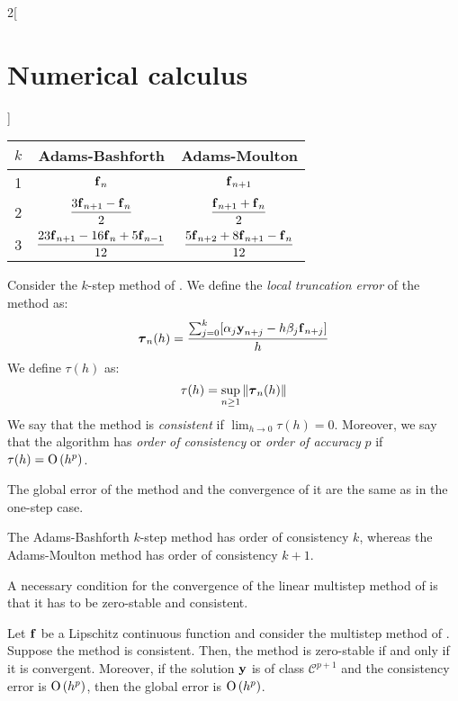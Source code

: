 \documentclass[../../../main_math.tex]{subfiles}
\begin{document}
\begin{multicols}{2}[\section{Numerical calculus}]
\begin{definition}
    \begin{center}
      \renewcommand{\arraystretch}{1.7}
      \begin{tabular}[ht]{c|c|c}
        $k$ & Adams-Bashforth                                                   & Adams-Moulton                                                  \\
        \hline
        1   & $\boldsymbol{\mathrm{f}}_n$                                                        & $\boldsymbol{\mathrm{f}}_{n+1}$                                                 \\
        2   & $\displaystyle\frac{3\boldsymbol{\mathrm{f}}_{n+1}-\boldsymbol{\mathrm{f}}_n}{2}$                   & $\displaystyle\frac{\boldsymbol{\mathrm{f}}_{n+1}+\boldsymbol{\mathrm{f}}_n}{2}$                 \\
        3   & $\displaystyle\frac{23\boldsymbol{\mathrm{f}}_{n+1}-16\boldsymbol{\mathrm{f}}_n+5\boldsymbol{\mathrm{f}}_{n-1}}{12}$ & $\displaystyle\frac{5\boldsymbol{\mathrm{f}}_{n+2}+8\boldsymbol{\mathrm{f}}_{n+1}-\boldsymbol{\mathrm{f}}_n}{12}$ \\
      \end{tabular}
    \end{center}
  \end{definition}
  \begin{definition}
    Consider the $k$-step method of . We define the \emph{local truncation error} of the method as:
    $$
      \boldsymbol{\mathrm{\tau}}_n(h)=\frac{\sum_{j=0}^k[\alpha_j\boldsymbol{\mathrm{y}}_{n+j}-h\beta_j\boldsymbol{\mathrm{{f}}}_{n+j}]}{h}
    $$
    We define $\tau(h)$ as:
    $$
      \tau(h)=\sup_{n\geq 1}\left\|\boldsymbol{\mathrm{\tau}}_n(h)\right\|
    $$
    We say that the method is \emph{consistent} if $\displaystyle\lim_{h\to 0}\tau(h)=0$. Moreover, we say that the algorithm has \emph{order of consistency} or \emph{order of accuracy} $p$ if $\tau(h)=\mathrm{O}\left(h^p\right)$.
  \end{definition}
  \begin{remark}
    The global error of the method and the convergence of it are the same as in the one-step case.
  \end{remark}
  \begin{proposition}
    The Adams-Bashforth $k$-step method has order of consistency $k$, whereas the Adams-Moulton method has order of consistency $k+1$.
  \end{proposition}
  \begin{theorem}
    A necessary condition for the convergence of the linear multistep method of  is that it has to be zero-stable and consistent.
  \end{theorem}
  \begin{theorem}
    Let $\boldsymbol{\mathrm{f}}$ be a Lipschitz continuous function and consider the multistep method of . Suppose the method is consistent. Then, the method is zero-stable if and only if it is convergent. Moreover, if the solution $\boldsymbol{\mathrm{y}}$ is of class $\mathcal{C}^{p+1}$ and the consistency error is $\mathrm{O}\left(h^p\right)$, then the global error is $\mathrm{O}\left(h^{p}\right)$.
  \end{theorem}

\end{multicols}
\end{document}
